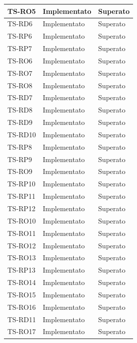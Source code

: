 \begin{longtable}{|>{\centering\arraybackslash}m{1.6cm}|>{\centering\arraybackslash}m{6.41cm}|>{\centering\arraybackslash}m{3.1cm}|}
		TS-RO5		
		& Implementato
		& Superato 
		\\ \hline
		\rowcolor{white}
		TS-RD6		
		& Implementato
		& Superato 
		\\ \hline
		\rowcolor{LightGray}
		TS-RP6		
		& Implementato
		& Superato 
		\\ \hline
		\rowcolor{white}
		TS-RP7		
		& Implementato
		& Superato 
		\\ \hline
		\rowcolor{LightGray}
		TS-RO6		
		& Implementato
		& Superato 
		\\ \hline
		\rowcolor{white}
		TS-RO7		
		& Implementato
		& Superato 
		\\ \hline
		\rowcolor{LightGray}
		TS-RO8		
		& Implementato
		& Superato 
		\\ \hline
		\rowcolor{white}
		TS-RD7		
		& Implementato
		& Superato 
		\\ \hline
		\rowcolor{LightGray}
		TS-RD8		
		& Implementato
		& Superato 
		\\ \hline
		\rowcolor{white}
		TS-RD9
		& Implementato
		& Superato 
		\\ \hline
		\rowcolor{LightGray}
		TS-RD10		
		& Implementato
		& Superato 
		\\ \hline
		\rowcolor{white}
		TS-RP8		
		& Implementato
		& Superato 
		\\ \hline
		\rowcolor{LightGray}
		TS-RP9		
		& Implementato
		& Superato 
		\\ \hline
		\rowcolor{white}
		TS-RO9
		& Implementato
		& Superato 
		\\ \hline
		\rowcolor{LightGray}
		TS-RP10		
		& Implementato
		& Superato 
		\\ \hline
		\rowcolor{white}
		TS-RP11		
		& Implementato
		& Superato 
		\\ \hline
		\rowcolor{LightGray}
		TS-RP12		
		& Implementato
		& Superato 
		\\ \hline
		
		\rowcolor{white}
		TS-RO10	
		& Implementato
		& Superato 
		\\ \hline
		\rowcolor{LightGray}
		TS-RO11	
		& Implementato
		& Superato 
		\\ \hline
		\rowcolor{white}
		TS-RO12
		& Implementato
		& Superato 
		\\ \hline
		\rowcolor{LightGray}
		TS-RO13
		& Implementato
		& Superato 
		\\ \hline
		\rowcolor{white}
		TS-RP13
		& Implementato
		& Superato 
		\\ \hline
		\rowcolor{LightGray}
		TS-RO14
		& Implementato
		& Superato 
		\\ \hline
		\rowcolor{white}
		TS-RO15	
		& Implementato
		& Superato 
		\\ \hline
		\rowcolor{LightGray}
		TS-RO16
		& Implementato
		& Superato 
		\\ \hline
		\rowcolor{white}
		TS-RD11	
		& Implementato
		& Superato 
		\\ \hline
		\rowcolor{LightGray}
		TS-RO17
		& Implementato
		& Superato 
		\\ \hline
		

\end{longtable}
